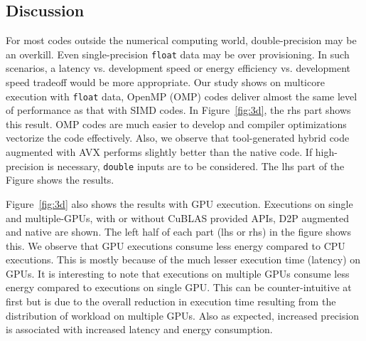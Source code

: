 \subsection{Discussion}

For most codes outside the numerical computing world, double-precision may be an overkill. Even single-precision \texttt{float} data may be over provisioning. In such scenarios, a latency vs. development speed or energy efficiency vs. development speed tradeoff would be more appropriate. Our study shows on multicore execution with \texttt{float} data, OpenMP (OMP) codes deliver almost the same level of performance as that with SIMD codes. In Figure~\ref{fig:3d}, the rhs part shows this result.  OMP codes are much easier to develop and compiler optimizations vectorize the code effectively. Also, we observe that tool-generated hybrid code augmented with AVX performs slightly better than the native code.  If high-precision is necessary, \texttt{double} inputs are to be considered. The lhs part of the Figure shows the results. 

 Figure~\ref{fig:3d} also shows the results with GPU execution. Executions on single and multiple-GPUs, with or without CuBLAS provided APIs, D2P augmented and native are shown. The left half of each part (lhs or rhs) in the figure shows this. We observe that GPU executions consume less energy compared to CPU executions. This is mostly because of the much lesser execution time (latency) on GPUs. It is interesting to note that executions on multiple GPUs consume less energy compared to executions on single GPU. This can be counter-intuitive at first but is due to the overall reduction in execution time  resulting from the distribution of workload on multiple GPUs. Also as expected, increased precision is associated with increased latency and energy consumption. 


